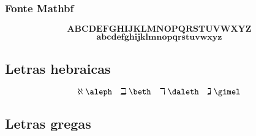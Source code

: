 \subsubsection{Fonte Mathbf}
\begin{equation*}
    \mathbf{A}\mathbf{B}\mathbf{C}\mathbf{D}\mathbf{E}\mathbf{F}\mathbf{G}\mathbf{H}\mathbf{I}\mathbf{J}\mathbf{K}\mathbf{L}\mathbf{M}\mathbf{N}\mathbf{O}\mathbf{P}\mathbf{Q}\mathbf{R}\mathbf{S}\mathbf{T}\mathbf{U}\mathbf{V}\mathbf{W}\mathbf{X}\mathbf{Y}\mathbf{Z}
\end{equation*}
\begin{equation*}
    \mathbf{a}\mathbf{b}\mathbf{c}\mathbf{d}\mathbf{e}\mathbf{f}\mathbf{g}\mathbf{h}\mathbf{i}\mathbf{j}\mathbf{k}\mathbf{l}\mathbf{m}\mathbf{n}\mathbf{o}\mathbf{p}\mathbf{q}\mathbf{r}\mathbf{s}\mathbf{t}\mathbf{u}\mathbf{v}\mathbf{w}\mathbf{x}\mathbf{y}\mathbf{z}
\end{equation*}

\subsection{Letras hebraicas}
\begin{equation*}
    \aleph \; \verb|\aleph| \quad \beth \; \verb|\beth| \quad \daleth \; \verb|\daleth| \quad \gimel \; \verb|\gimel|
\end{equation*}

\subsection{Letras gregas}

